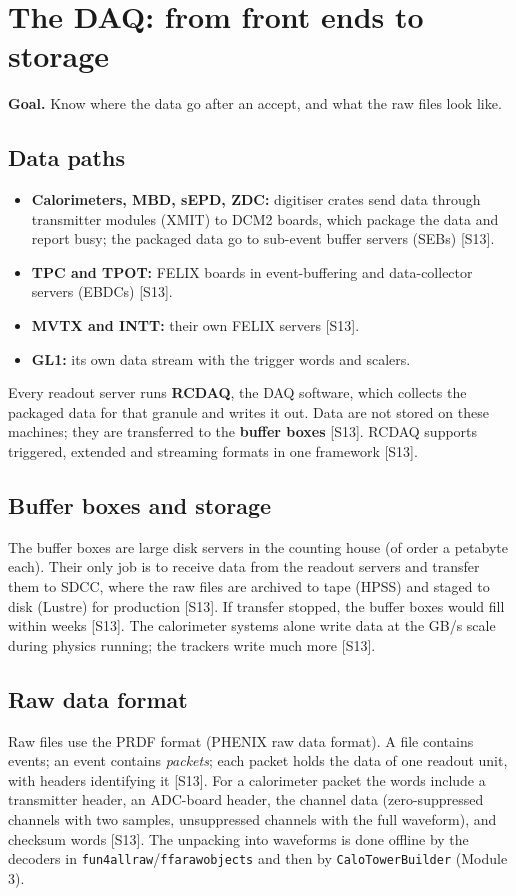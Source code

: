 \documentclass[11pt,letterpaper]{article}
\newcommand{\goal}[1]{\par\noindent\textbf{Goal.} #1\par\smallskip}
\newcommand{\code}[1]{\texttt{#1}}
\begin{document}
\section{The DAQ: from front ends to storage}\label{sec:daq}
\goal{Know where the data go after an accept, and what the raw files look like.}

\subsection{Data paths}
\begin{itemize}
\item \textbf{Calorimeters, MBD, sEPD, ZDC:} digitiser crates send data through transmitter modules (XMIT) to DCM2 boards, which package the data and report busy; the packaged data go to sub-event buffer servers (SEBs) [S13].
\item \textbf{TPC and TPOT:} FELIX boards in event-buffering and data-collector servers (EBDCs) [S13].
\item \textbf{MVTX and INTT:} their own FELIX servers [S13].
\item \textbf{GL1:} its own data stream with the trigger words and scalers.
\end{itemize}
Every readout server runs \textbf{RCDAQ}, the DAQ software, which collects the packaged data for that granule and writes it out. Data are not stored on these machines; they are transferred to the \textbf{buffer boxes} [S13].
RCDAQ supports triggered, extended and streaming formats in one framework [S13].

\subsection{Buffer boxes and storage}
The buffer boxes are large disk servers in the counting house (of order a petabyte each). Their only job is to receive data from the readout servers and transfer them to SDCC, where the raw files are archived to tape (HPSS) and staged to disk (Lustre) for production [S13].
If transfer stopped, the buffer boxes would fill within weeks [S13].
The calorimeter systems alone write data at the GB/s scale during physics running; the trackers write much more [S13].

\subsection{Raw data format}
Raw files use the PRDF format (PHENIX raw data format). A file contains events; an event contains \emph{packets}; each packet holds the data of one readout unit, with headers identifying it [S13].
For a calorimeter packet the words include a transmitter header, an ADC-board header, the channel data (zero-suppressed channels with two samples, unsuppressed channels with the full waveform), and checksum words [S13].
The unpacking into waveforms is done offline by the decoders in \code{fun4allraw}/\code{ffarawobjects} and then by \code{CaloTowerBuilder} (Module 3).
\end{document}
